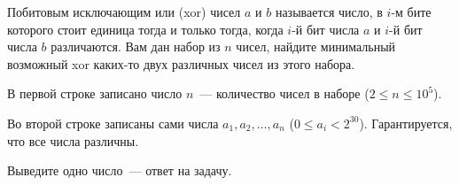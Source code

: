 Побитовым исключающим или (xor) чисел $a$ и $b$ называется число,
в $i$-м бите которого стоит единица тогда и только тогда, когда
$i$-й бит числа $a$ и $i$-й бит числа $b$ различаются.
Вам дан набор из $n$ чисел, найдите минимальный возможный xor
каких-то двух различных чисел из этого набора.

\InputFile

В первой строке записано число $n$~--- количество чисел в наборе ($2 \le n \le 10^5$).

Во второй строке записаны сами числа $a_1, a_2, \ldots, a_n$ ($0 \le a_i < 2^{30}$).
Гарантируется, что все числа различны.

\OutputFile

Выведите одно число~--- ответ на задачу.

\SAMPLES
